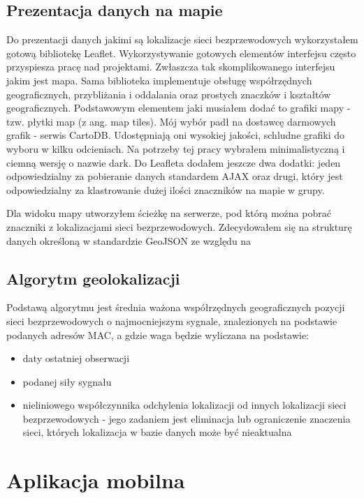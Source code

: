 \subsection{Prezentacja danych na mapie}
Do prezentacji danych jakimi są lokalizacje sieci bezprzewodowych wykorzystałem gotową bibliotekę Leaflet. Wykorzystywanie gotowych elementów interfejsu często przyspiesza pracę nad projektami. Zwłaszcza tak skomplikowanego interfejsu jakim jest mapa. Sama biblioteka implementuje obsługę współrzędnych geograficznych, przybliżania i oddalania oraz prostych znaczków i kształtów geograficznych. Podstawowym elementem jaki musiałem dodać to grafiki mapy - tzw. płytki map (z ang. map tiles). Mój wybór padł na dostawcę darmowych grafik - serwis CartoDB. Udostępniają oni wysokiej jakości, schludne grafiki do wyboru w kilku odcieniach. Na potrzeby tej pracy wybrałem minimalistyczną i ciemną wersję o nazwie dark. Do Leafleta dodałem jeszcze dwa dodatki: jeden odpowiedzialny za pobieranie danych standardem AJAX oraz drugi, który jest odpowiedzialny za klastrowanie dużej ilości znaczników na mapie w grupy. 

Dla widoku mapy utworzyłem ścieżkę na serwerze, pod którą można pobrać znaczniki z lokalizacjami sieci bezprzewodowych. Zdecydowałem się na strukturę danych określoną w standardzie GeoJSON ze względu na 


\subsection{Algorytm geolokalizacji}
Podstawą algorytmu jest średnia ważona współrzędnych geograficznych pozycji sieci bezprzewodowych o najmocniejszym sygnale, znalezionych na podstawie podanych adresów MAC, a gdzie waga będzie wyliczana na podstawie: 

\begin{itemize}
\item daty ostatniej obserwacji
\item podanej siły sygnału
\item nieliniowego współczynnika odchylenia lokalizacji od innych lokalizacji sieci bezprzewodowych - jego zadaniem jest eliminacja lub ograniczenie znaczenia sieci, których lokalizacja w bazie danych może być nieaktualna
\end{itemize}

\section{Aplikacja mobilna}
